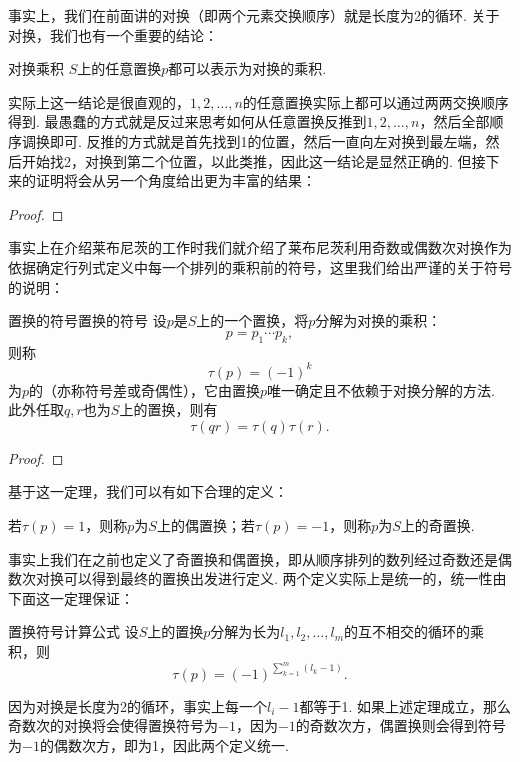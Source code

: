 事实上，我们在前面讲的对换（即两个元素交换顺序）就是长度为2的循环. 关于对换，我们也有一个重要的结论：
\begin{theorem}{}{对换乘积}
    $S$上的任意置换$p$都可以表示为对换的乘积.
\end{theorem}

实际上这一结论是很直观的，$1,2,\ldots,n$的任意置换实际上都可以通过两两交换顺序得到. 最愚蠢的方式就是反过来思考如何从任意置换反推到$1,2,\ldots,n$，然后全部顺序调换即可. 反推的方式就是首先找到1的位置，然后一直向左对换到最左端，然后开始找2，对换到第二个位置，以此类推，因此这一结论是显然正确的. 但接下来的证明将会从另一个角度给出更为丰富的结果：

\begin{proof}

\end{proof}

事实上在介绍莱布尼茨的工作时我们就介绍了莱布尼茨利用奇数或偶数次对换作为依据确定行列式定义中每一个排列的乘积前的符号，这里我们给出严谨的关于符号的说明：
\begin{theorem}{置换的符号}{置换的符号}
    设$p$是$S$上的一个置换，将$p$分解为对换的乘积：
    \[p=p_1\cdots p_k,\]
    则称
    \[\tau(p)=(-1)^k\]
    为$p$的（亦称符号差或奇偶性），它由置换$p$唯一确定且不依赖于对换分解的方法. 此外任取$q,r$也为$S$上的置换，则有
    \[\tau(qr)=\tau(q)\tau(r).\]
\end{theorem}

\begin{proof}

\end{proof}

基于这一定理，我们可以有如下合理的定义：
\begin{definition}{}{}
    若$\tau(p)=1$，则称$p$为$S$上的偶置换；若$\tau(p)=-1$，则称$p$为$S$上的奇置换.
\end{definition}

事实上我们在之前也定义了奇置换和偶置换，即从顺序排列的数列经过奇数还是偶数次对换可以得到最终的置换出发进行定义. 两个定义实际上是统一的，统一性由下面这一定理保证：
\begin{theorem}{}{置换符号计算公式}
    设$S$上的置换$p$分解为长为$l_1,l_2,\ldots,l_m$的互不相交的循环的乘积，则
    \[\tau(p)=(-1)^{\sum\limits_{k=1}^m(l_k-1)}.\]
\end{theorem}

因为对换是长度为2的循环，事实上每一个$l_i-1$都等于1. 如果上述定理成立，那么奇数次的对换将会使得置换符号为$-1$，因为$-1$的奇数次方，偶置换则会得到符号为$-1$的偶数次方，即为1，因此两个定义统一.

